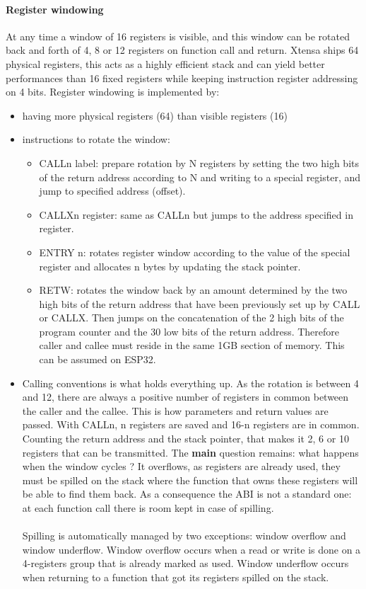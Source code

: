 \documentclass[a4paper]{article}
\begin{document}
\paragraph{Register windowing}
At any time a window of 16 registers is visible, and this window can be rotated back and forth of 4, 8 or 12 registers on function call and return. Xtensa ships 64 physical registers, this acts as a highly efficient stack and can yield better performances than 16 fixed registers while keeping instruction register addressing on 4 bits. Register windowing is implemented by:
\begin{itemize}
    \item having more physical registers (64) than visible registers (16)
    \item instructions to rotate the window:
    \begin{itemize}
        \item CALLn label: prepare rotation by N registers by setting the two high bits of the return address according to N and writing to a special register, and jump to specified address (offset).
        \item CALLXn register: same as CALLn but jumps to the address specified in register.
        \item ENTRY n: rotates register window according to the value of the special register and allocates n bytes by updating the stack pointer.
        \item RETW: rotates the window back by an amount determined by the two high bits of the return address that have been previously set up by CALL or CALLX. Then jumps on the concatenation of the 2 high bits of the program counter and the 30 low bits of the return address. Therefore caller and callee must reside in the same 1GB section of memory. This can be assumed on ESP32. 
    \end{itemize}
    \item Calling conventions is what holds everything up. As the rotation is between 4 and 12, there are always a positive number of registers in common between the caller and the callee. This is how parameters and return values are passed. With CALLn, n registers are saved and 16-n registers are in common. Counting the return address and the stack pointer, that makes it 2, 6 or 10 registers that can be transmitted. The \textbf{main} question remains: what happens when the window cycles ? It overflows, as registers are already used, they must be spilled on the stack where the function that owns these registers will be able to find them back. As a consequence the ABI is not a standard one: at each function call there is room kept in case of spilling.
\paragraph{}
Spilling is automatically managed by two exceptions: window overflow and window underflow. Window overflow occurs when a read or write is done on a 4-registers group that is already marked as used. Window underflow occurs when returning to a function that got its registers spilled on the stack.
\end{itemize}
\end{document}
